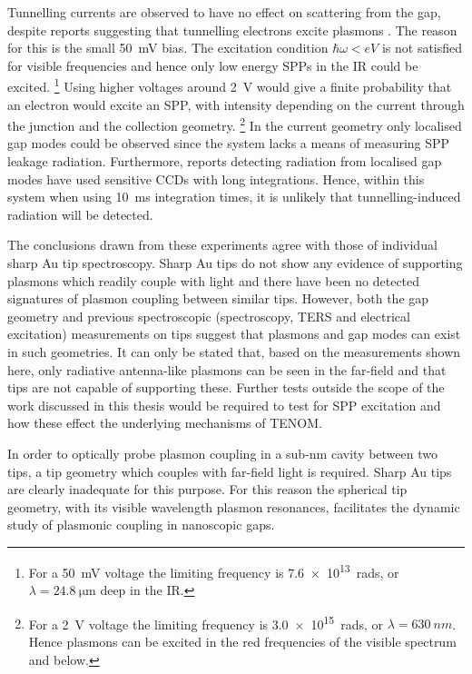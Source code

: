 \documentclass[a4paper]{article}
\begin{document}
Tunnelling currents are observed to have no effect on scattering from the gap, despite reports suggesting that tunnelling electrons excite plasmons \cite{lambe1976, berndt1991, bharadwaj2011, wang2011, divitt2013, ye2014}. The reason for this is the small \SI{50}{mV} bias. The excitation condition $\hbar\omega<eV$ is not satisfied for visible frequencies and hence only low energy SPPs in the IR could be excited.%
\footnote{For a \SI{50}{mV} voltage the limiting frequency is \SI{7.6e13}{rads}, or $\lambda=\SI{24.8}{\micro\metre}$ deep in the IR.}
Using higher voltages around \SI{2}{V} would give a finite probability that an electron would excite an SPP, with intensity depending on the current through the junction and the collection geometry.%
\footnote{For a \SI{2}{V} voltage the limiting frequency is \SI{3.0e15}{rads}, or $\lambda=\SI{630}{nm}$. Hence plasmons can be excited in the red frequencies of the visible spectrum and below.}
In the current geometry only localised gap modes could be observed since the system lacks a means of measuring SPP leakage radiation. Furthermore, reports detecting radiation from localised gap modes have used sensitive CCDs with long integrations. Hence, within this system when using \SI{10}{ms} integration times, it is unlikely that tunnelling-induced radiation will be detected.

The conclusions drawn from these experiments agree with those of individual sharp Au tip spectroscopy. Sharp Au tips do not show any evidence of supporting plasmons which readily couple with light and there have been no detected signatures of plasmon coupling between similar tips. However, both the gap geometry and previous spectroscopic (spectroscopy, TERS and electrical excitation) measurements on tips suggest that plasmons and gap modes can exist in such geometries. It can only be stated that, based on the measurements shown here, only radiative antenna-like plasmons can be seen in the far-field and that tips are not capable of supporting these. Further tests outside the scope of the work discussed in this thesis would be required to test for SPP excitation and how these effect the underlying mechanisms of TENOM.

In order to optically probe plasmon coupling in a sub-nm cavity between two tips, a tip geometry which couples with far-field light is required. Sharp Au tips are clearly inadequate for this purpose. For this reason the spherical tip geometry, with its visible wavelength plasmon resonances, facilitates the dynamic study of plasmonic coupling in nanoscopic gaps.
\end{document}
